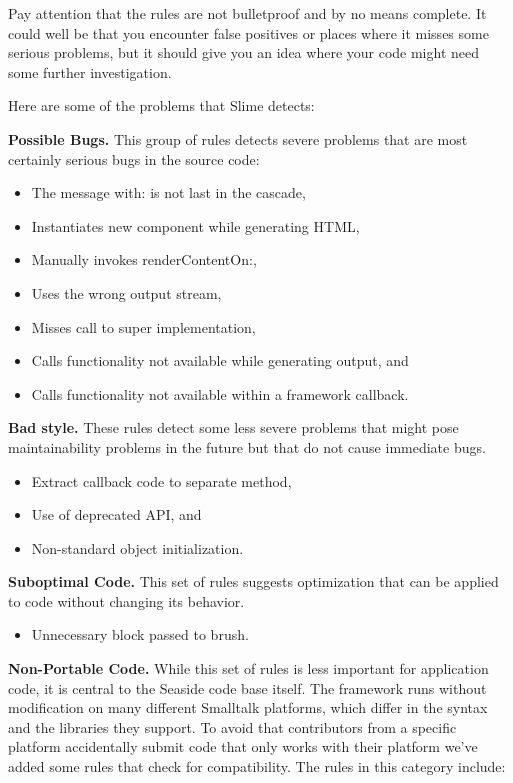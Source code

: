 \documentclass[a4paper,10pt,twoside]{book}
\newcommand{\ct}[1]{{\small\ttfamily\textup{#1}}}
\begin{document}
Pay attention that the rules are not bulletproof and by no means complete. It could well be that you encounter false positives or places where it misses some serious problems, but it should give you an idea where your code might need some further investigation. 

Here are some of the problems that Slime detects:

\textbf{Possible Bugs.} This group of rules detects severe problems that are most certainly serious bugs in the source code:

\begin{itemize}
\item  The message \ct{with:} is not last in the cascade,
\item  Instantiates new component while generating HTML, 
\item  Manually invokes \ct{renderContentOn:},
\item  Uses the wrong output stream, 
\item  Misses call to super implementation,
\item  Calls functionality not available while generating output, and 
\item  Calls functionality not available within a framework callback.
\end{itemize}

\textbf{Bad style.} These rules detect some less severe problems that might pose maintainability problems in the future but that do not cause immediate bugs.

\begin{itemize}
\item  Extract callback code to separate method,
\item  Use of deprecated API, and
\item  Non-standard object initialization.
\end{itemize}

\textbf{Suboptimal Code.} This set of rules suggests optimization that can be applied to code without changing its behavior. 

\begin{itemize}
\item  Unnecessary block passed to brush.
\end{itemize}

\textbf{Non-Portable Code.} While this set of rules is less important for application code, it is central to the Seaside code base itself. The framework runs without modification on many different Smalltalk platforms, which differ in the syntax and the libraries they support. To avoid that contributors from a specific platform accidentally submit code that only works with their platform we've added some rules that check for compatibility. The rules in this category include:
\end{document}
